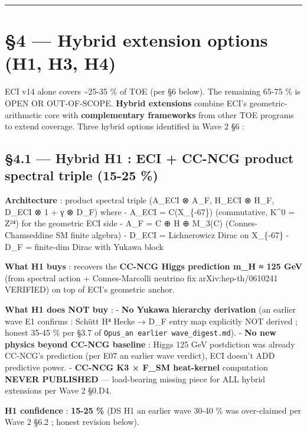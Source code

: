 \documentclass[
  11pt,
  a4paper,
]{article}
\begin{document}
\begin{center}\rule{0.5\linewidth}{0.5pt}\end{center}

\hypertarget{hybrid-extension-options-h1-h3-h4}{%
\section{§4 --- Hybrid extension options (H1, H3, H4)}\label{hybrid-extension-options-h1-h3-h4}}

ECI v14 alone covers \textasciitilde25-35 \% of TOE (per §6 below). The remaining 65-75 \% is OPEN OR OUT-OF-SCOPE. \textbf{Hybrid extensions} combine ECI's geometric-arithmetic core with \textbf{complementary frameworks} from other TOE programs to extend coverage. Three hybrid options identified in Wave 2 §6 :

\hypertarget{hybrid-h1-eci-cc-ncg-product-spectral-triple-15-25}{%
\subsection{§4.1 --- Hybrid H1 : ECI + CC-NCG product spectral triple (15-25 \%)}\label{hybrid-h1-eci-cc-ncg-product-spectral-triple-15-25}}

\textbf{Architecture} : product spectral triple (A\_ECI ⊗ A\_F, H\_ECI ⊗ H\_F, D\_ECI ⊗ 1 + γ ⊗ D\_F) where
- A\_ECI = C(X\_\{-67\}) (commutative, K\^{}0 = Z²⁴) for the geometric ECI side
- A\_F = C ⊕ H ⊕ M\_3(C) (Connes-Chamseddine SM finite algebra)
- D\_ECI = Lichnerowicz Dirac on X\_\{-67\}
- D\_F = finite-dim Dirac with Yukawa block

\textbf{What H1 buys} : recovers the \textbf{CC-NCG Higgs prediction m\_H ≈ 125 GeV} (from spectral action + Connes-Marcolli neutrino fix arXiv:hep-th/0610241 VERIFIED) on top of ECI's geometric anchor.

\textbf{What H1 does NOT buy} :
- \textbf{No Yukawa hierarchy derivation} (an earlier wave E1 confirms : Schütt H⁴ Hecke → D\_F entry map explicitly NOT derived ; honest 35-45 \% per §3.7 of \texttt{Opus\_an earlier wave\_digest.md}).
- \textbf{No new physics beyond CC-NCG baseline} : Higgs 125 GeV postdiction was already CC-NCG's prediction (per E07 an earlier wave verdict), ECI doesn't ADD predictive power.
- \textbf{CC-NCG K3 × F\_SM heat-kernel} computation \textbf{NEVER PUBLISHED} --- load-bearing missing piece for ALL hybrid extensions per Wave 2 §0.D4.

\textbf{H1 confidence} : \textbf{15-25 \%} (DS H1 an earlier wave 30-40 \% was over-claimed per Wave 2 §6.2 ; honest revision below).
\end{document}
